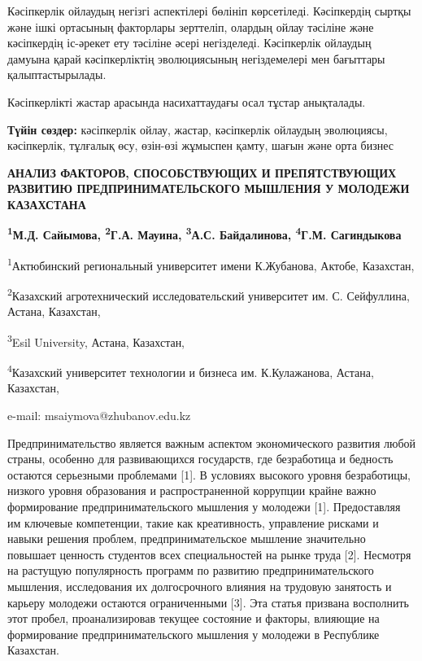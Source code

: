 Кәсіпкерлік ойлаудың негізгі аспектілері бөлініп көрсетіледі.
Кәсіпкердің сыртқы және ішкі ортасының факторлары зерттеліп, олардың
ойлау тәсіліне және кәсіпкердің іс-әрекет ету тәсіліне әсері
негізделеді. Кәсіпкерлік ойлаудың дамуына қарай кәсіпкерліктің
эволюциясының негіздемелері мен бағыттары қалыптастырылады.

Кәсіпкерлікті жастар арасында насихаттаудағы осал тұстар анықталады.

{\bfseries Түйін сөздер:} кәсіпкерлік ойлау, жастар, кәсіпкерлік ойлаудың
эволюциясы, кәсіпкерлік, тұлғалық өсу, өзін-өзі жұмыспен қамту, шағын
және орта бизнес
\begin{articleheader}

{\bfseries АНАЛИЗ ФАКТОРОВ, СПОСОБСТВУЮЩИХ И ПРЕПЯТСТВУЮЩИХ РАЗВИТИЮ ПРЕДПРИНИМАТЕЛЬСКОГО МЫШЛЕНИЯ У МОЛОДЕЖИ КАЗАХСТАНА}

{\bfseries \textsuperscript{1}М.Д. Сайымова\textsuperscript{\envelope },
\textsuperscript{2}Г.А. Мауина, \textsuperscript{3}А.С. Байдалинова,
\textsuperscript{4}Г.М. Сагиндыкова}
\end{articleheader}
\begin{affiliation}

\textsuperscript{1}Актюбинский региональный университет имени
К.Жубанова, Актобе, Казахстан,

\textsuperscript{2}Казахский агротехнический исследовательский
университет им. С. Сейфуллина, Астана, Казахстан,

\textsuperscript{3}Esil University, Астана, Казахстан,

\textsuperscript{4}Казахский университет технологии и бизнеса им.
К.Кулажанова, Астана, Казахстан,

e-mail: msaiymova@zhubanov.edu.kz
\end{affiliation}

Предпринимательство является важным аспектом экономического развития
любой страны, особенно для развивающихся государств, где безработица и
бедность остаются серьезными проблемами {[}1{]}. В условиях высокого
уровня безработицы, низкого уровня образования и распространенной
коррупции крайне важно формирование предпринимательского мышления у
молодежи {[}1{]}. Предоставляя им ключевые компетенции, такие как
креативность, управление рисками и навыки решения проблем,
предпринимательское мышление значительно повышает ценность студентов
всех специальностей на рынке труда {[}2{]}. Несмотря на растущую
популярность программ по развитию предпринимательского мышления,
исследования их долгосрочного влияния на трудовую занятость и карьеру
молодежи остаются ограниченными {[}3{]}. Эта статья призвана восполнить
этот пробел, проанализировав текущее состояние и факторы, влияющие на
формирование предпринимательского мышления у молодежи в Республике
Казахстан.

